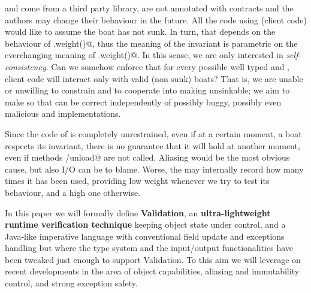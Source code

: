 \Q@Item@ and \Q@Items@ come from a third party library,  are not annotated with contracts and the authors may change their behaviour in the future.
All the code using \Q@Boat@  (client code) would like to 
assume the boat has not sunk.
In turn, that depends on the behaviour of \Q@Items.weight()@, thus the meaning of the \Q@Boat@ invariant is parametric on the everchanging meaning of  \Q@Items.weight()@.
In this sense, we are only interested in \emph{self-consistency}.
Can we somehow enforce that for every possible well typed \Q@Item@ and \Q@Items@, client code will interact only with valid (non sunk)  boats?
That is, we are unable or unwilling to constrain \Q@Item@ and \Q@Items@ to
cooperate into making \Q@Boat@s unsinkable; we aim
to make so that \Q@Boat@s can be correct independently of
possibly buggy, possibly even malicious \Q@Item@ and \Q@Items@ implementations.

Since the code of \Q@Items@ is completely unrestrained, 
even if at a certain moment, a boat respects its
invariant, there is no guarantee that
it will hold at another moment,
even if methods \Q@load/unload@ are not called.
Aliasing would be the most obvious cause, but also I/O can be to blame.
Worse, the \Q@cargo@ may internally record how many times
it has been used, providing low weight whenever we try to test its behaviour, and a high one otherwise.


In this paper we will formally define  \textbf{Validation}, an \textbf{ultra-lightweight runtime verification technique} 
 keeping object state under control, and 
 a Java-like imperative language
 with conventional field update and exceptions handling
 but where the type system and the input/output functionalities
 have been tweaked just enough to support Validation.
 To this aim we will leverage on recent developments in the area of object capabilities,
 aliasing and immutability control, and strong exception safety.





